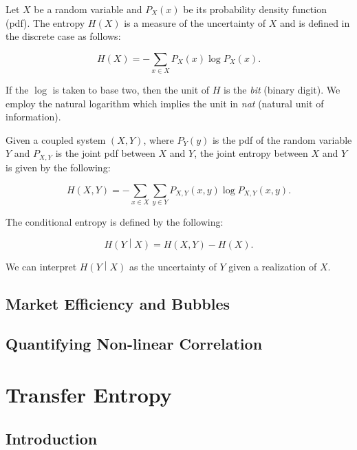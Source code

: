 \documentclass[]{book}
\theoremstyle{definition}
\theoremstyle{definition}
\theoremstyle{definition}
\theoremstyle{remark}
\begin{document}
Let \(X\) be a random variable and \(P_X(x)\) be its probability density
function (pdf). The entropy \(H(X)\) is a measure of the uncertainty of
\(X\) and is defined in the discrete case as follows:

\begin{equation}
H(X) = -\sum_{x \in X}{P_X(x)\log{P_X(x)}}.
\label{eq:H}
\end{equation}

If the \(\log\) is taken to base two, then the unit of \(H\) is the
\textit{bit} (binary digit). We employ the natural logarithm which
implies the unit in \textit{nat} (natural unit of information).

Given a coupled system \((X,Y)\), where \(P_Y(y)\) is the pdf of the
random variable \(Y\) and \(P_{X,Y}\) is the joint pdf between \(X\) and
\(Y\), the joint entropy between \(X\) and \(Y\) is given by the
following:

\begin{equation}
H(X,Y) = -\sum_{x \in X}{\sum_{y \in Y}{P_{X,Y}(x,y)\log{P_{X,Y}(x,y)}}}.
\label{eq:HXY}
\end{equation}

The conditional entropy is defined by the following:

\begin{equation}
H\left(Y\middle\vert X\right) = H(X,Y) - H(X).
\end{equation}

We can interpret \(H\left(Y\middle\vert X\right)\) as the uncertainty of
\(Y\) given a realization of \(X\).

\section{Market Efficiency and
Bubbles}\label{market-efficiency-and-bubbles}

\section{Quantifying Non-linear
Correlation}\label{quantifying-non-linear-correlation}

\chapter{Transfer Entropy}\label{transfer-entropy}

\section{Introduction}\label{introduction-2}
\end{document}

